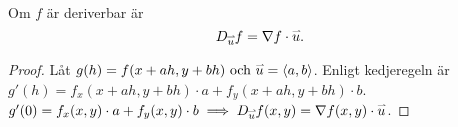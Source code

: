 \documentclass[a4paper]{article}
\begin{document}
\begin{sats}
    Om \(
        f
    \) är deriverbar är \[
        D_{\accentset{\rightharpoonup}{u} } f = \nabla f \cdot \accentset{\rightharpoonup}{u}.
    \] 

    \begin{proof}
        Låt \(
            g(h) = f(x+ah, y+bh) \text{ och } \accentset{\rightharpoonup}{u} = \left\langle a, b \right\rangle
        \). Enligt kedjeregeln är \(
            g'(h) = f_x(x+ah, y+bh) \cdot a + f_y(x+ah, y+bh) \cdot b
        \). \(
            g'(0) = f_x(x, y) \cdot a + f_y(x, y ) \cdot b \implies 
            D_{\accentset{\rightharpoonup}{u} }f(x,y) = \nabla f(x,y) \cdot \accentset{\rightharpoonup}{u} 
        \).
    \end{proof}
\end{sats}
\end{document}
